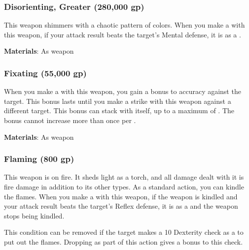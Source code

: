 \lowercase{\hypertarget{item:Disorienting, Greater}{}}\label{item:Disorienting, Greater}
\hypertarget{item:Disorienting, Greater}{\subsubsection{Disorienting, Greater\hfill{} (280,000 gp)}}

This weapon shimmers with a chaotic pattern of colors.
When you make a  with this weapon, if your attack result beats the target's Mental defense, it is \disoriented as a .



\vspace{0.25em}
\textbf{Materials}: As weapon


\lowercase{\hypertarget{item:Fixating}{}}\label{item:Fixating}
\hypertarget{item:Fixating}{\subsubsection{Fixating\hfill{} (55,000 gp)}}

When you make a  with this weapon, you gain a  bonus to accuracy against the target.
This bonus lasts until you make a strike with this weapon against a different target.
This bonus can stack with itself, up to a maximum of .
The bonus cannot increase more than once per .



\vspace{0.25em}
\textbf{Materials}: As weapon


\lowercase{\hypertarget{item:Flaming}{}}\label{item:Flaming}
\hypertarget{item:Flaming}{\subsubsection{Flaming\hfill{} (800 gp)}}

This weapon is on fire.
It sheds light as a torch, and all damage dealt with it is fire damage in addition to its other types.
As a standard action, you can kindle the flames.
When you make a  with this weapon, if the weapon is kindled and your attack result beats the target's Reflex defense,
it is  as a  and the weapon stops being kindled.

This condition can be removed if the target makes a  10 Dexterity check as a  to put out the flames.
Dropping  as part of this action gives a  bonus to this check.



